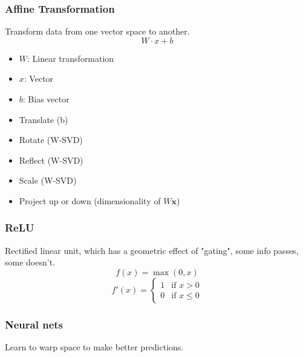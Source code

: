 \subsubsection{Affine Transformation}
\begin{notes} Transform data from one vector space to another.
    \begin{equation}
        W \cdot x + b
    \end{equation}
    \begin{itemize}
        \item $W$: Linear transformation
        \item $x$: Vector
        \item $b$: Bias vector
    \end{itemize}
    \vspace{1em}

    \begin{itemize}
        \item Translate (b)
        \item Rotate (W-SVD)
        \item Reflect (W-SVD)
        \item Scale (W-SVD)
        \item Project up or down (dimensionality of $W \mathbf{x}$)
    \end{itemize}
\end{notes}

\subsubsection{ReLU}
\begin{notes} Rectified linear unit, which has a geometric effect of "gating", some info passes, some doesn't.
    \begin{equation*}
        f(x) = \max(0,x)
    \end{equation*}
    \begin{equation*}
        f'(x) = \begin{cases}
            1 & \text{if } x > 0 \\
            0 & \text{if } x \leq 0
        \end{cases}
    \end{equation*}
\end{notes}

\subsubsection{Neural nets}
\begin{notes} Learn to warp space to make better predictions.
\end{notes}

